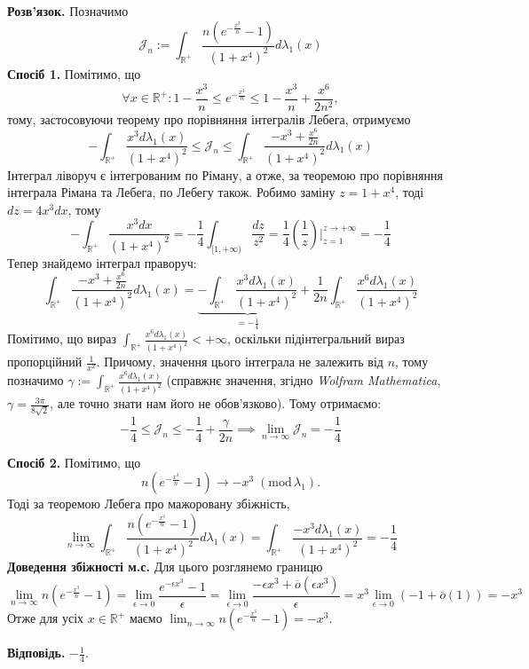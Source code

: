 \documentclass[14pt]{extarticle}
\begin{document}
\textbf{Розв'язок.} Позначимо
\[
\mathcal{J}_n := \int_{\mathbb{R}^+} \frac{n\left(e^{-\frac{x^3}{n}}-1\right)}{(1+x^4)^2}d\lambda_1(x)
\]
\textbf{Спосіб 1.} Помітимо, що
\[
\forall x \in \mathbb{R}^+: 1 - \frac{x^3}{n} \leq e^{-\frac{x^3}{n}} \leq 1-\frac{x^3}{n} + \frac{x^6}{2n^2},
\]
тому, застосовуючи теорему про порівняння інтегралів Лебега, отримуємо
\[
-\int_{\mathbb{R}^+}\frac{x^3 d\lambda_1(x)}{(1+x^4)^2} \leq \mathcal{J}_n \leq \int_{\mathbb{R}^+} \frac{-x^3 + \frac{x^6}{2n}}{(1+x^4)^2}d\lambda_1(x)
\]
Інтеграл ліворуч є інтегрованим по Ріману, а отже, за теоремою про порівняння інтеграла Рімана та Лебега, по Лебегу також. Робимо заміну $z=1+x^4$, тоді $dz=4x^3dx$, тому
\[
-\int_{\mathbb{R}^+} \frac{x^3dx}{(1+x^4)^2} = -\frac{1}{4}\int_{[1,+\infty)} \frac{dz}{z^2} = \frac{1}{4}\left(\frac{1}{z}\right)\Big|_{z=1}^{z\to+\infty} = -\frac{1}{4}
\]
Тепер знайдемо інтеграл праворуч:
\[
\int_{\mathbb{R}^+} \frac{-x^3+\frac{x^6}{2n}}{(1+x^4)^2}d\lambda_1(x) = \underbrace{-\int_{\mathbb{R}^+} \frac{x^3d\lambda_1(x)}{(1+x^4)^2}}_{=-\frac{1}{4}} + \frac{1}{2n}\int_{\mathbb{R}^+} \frac{x^6d\lambda_1(x)}{(1+x^4)^2}
\]
Помітимо, що вираз $\int_{\mathbb{R}^+}\frac{x^6d\lambda_1(x)}{(1+x^4)^2} < +\infty$, оскільки підінтегральний вираз пропорційний $\frac{1}{x^2}$. Причому, значення цього інтеграла не залежить від $n$, тому позначимо $\gamma := \int_{\mathbb{R}^+}\frac{x^6d\lambda_1(x)}{(1+x^4)^2}$ (справжнє значення, згідно \textit{Wolfram Mathematica}, $\gamma=\frac{3\pi}{8\sqrt{2}}$, але точно знати нам його не обов'язково). Тому отримаємо:
\[
-\frac{1}{4} \leq \mathcal{J}_n \leq -\frac{1}{4} + \frac{\gamma}{2n} \implies \boxed{\lim_{n \to \infty}\mathcal{J}_n = -\frac{1}{4}}
\]

\textbf{Спосіб 2.} Помітимо, що
\[
n\left(e^{-\frac{x^3}{n}}-1\right) \to -x^3 \; (\text{mod} \, \lambda_1).
\]
Тоді за теоремою Лебега про мажоровану збіжність,
\[
\lim_{n \to \infty}\int_{\mathbb{R}^+} \frac{n\left(e^{-\frac{x^3}{n}}-1\right)}{(1+x^4)^2}d\lambda_1(x) = \int_{\mathbb{R}^+} \frac{-x^3 d\lambda_1(x)}{(1+x^4)^2} = -\frac{1}{4}
\]
\textbf{Доведення збіжності м.с.} Для цього розглянемо границю
\[
\lim_{n \to \infty} n\left(e^{-\frac{x^3}{n}}-1\right) = \lim_{\epsilon \to 0} \frac{e^{-\epsilon x^3} - 1}{\epsilon} = \lim_{\epsilon \to 0} \frac{-\epsilon x^3 + \overline{o}(\epsilon x^3)}{\epsilon} = x^3\lim_{\epsilon \to 0}(-1 + \overline{o}(1)) = -x^3
\]
Отже для усіх $x \in \mathbb{R}^+$ маємо $\lim_{n \to \infty} n\left(e^{-\frac{x^3}{n}}-1\right)=-x^3$.

\textbf{Відповідь.} $-\frac{1}{4}$.
\end{document}
